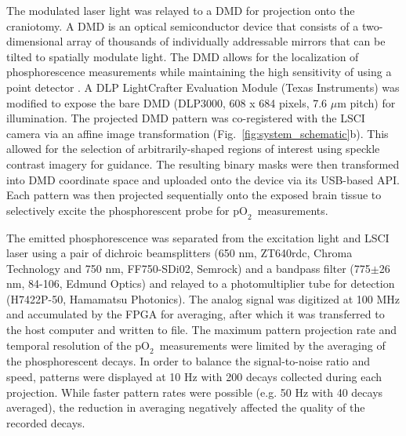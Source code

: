 \documentclass[12pt]{spieman}  %
\newcommand{\pO}{\ensuremath{\text{pO}_2}} 	            %
\begin{document}
\begin{spacing}{2}
The modulated laser light was relayed to a DMD for projection onto the craniotomy. A DMD is an optical semiconductor device that consists of a two-dimensional array of thousands of individually addressable mirrors that can be tilted to spatially modulate light. The DMD allows for the localization of phosphorescence measurements while maintaining the high sensitivity of using a point detector \cite{Ponticorvo:2010uv}. A DLP LightCrafter Evaluation Module (Texas Instruments) was modified to expose the bare DMD (DLP3000, 608 x 684 pixels, 7.6 $\mu$m pitch) for illumination. The projected DMD pattern was co-registered with the LSCI camera via an affine image transformation (Fig.~\ref{fig:system_schematic}b). This allowed for the selection of arbitrarily-shaped regions of interest using speckle contrast imagery for guidance. The resulting binary masks were then transformed into DMD coordinate space and uploaded onto the device via its USB-based API. Each pattern was then projected sequentially onto the exposed brain tissue to selectively excite the phosphorescent probe for \pO\ measurements.

The emitted phosphorescence was separated from the excitation light and LSCI laser using a pair of dichroic beamsplitters (650 nm, ZT640rdc, Chroma Technology and 750 nm, FF750-SDi02, Semrock) and a bandpass filter (775$\pm$26 nm, 84-106, Edmund Optics) and relayed to a photomultiplier tube for detection (H7422P-50, Hamamatsu Photonics). The analog signal was digitized at 100 MHz and accumulated by the FPGA for averaging, after which it was transferred to the host computer and written to file. The maximum pattern projection rate and temporal resolution of the \pO\ measurements were limited by the averaging of the phosphorescent decays. In order to balance the signal-to-noise ratio and speed, patterns were displayed at 10 Hz with 200 decays collected during each projection. While faster pattern rates were possible (e.g. 50 Hz with 40 decays averaged), the reduction in averaging negatively affected the quality of the recorded decays.



\end{spacing}
\end{document}
